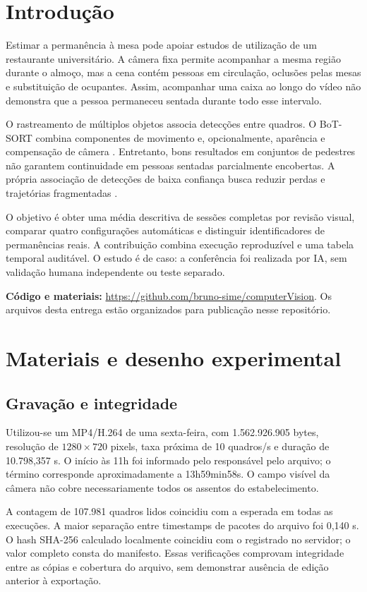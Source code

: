\documentclass[12pt,a4paper,twoside,openany,chapter=TITLE,subsection=TITLE,section=TITLE,subsubsection=TITLE,english,brazil]{abntex2}
\begin{document}
\chapter{Introdução}
Estimar a permanência à mesa pode apoiar estudos de utilização de um restaurante universitário. A câmera fixa permite acompanhar a mesma região durante o almoço, mas a cena contém pessoas em circulação, oclusões pelas mesas e substituição de ocupantes. Assim, acompanhar uma caixa ao longo do vídeo não demonstra que a pessoa permaneceu sentada durante todo esse intervalo.

O rastreamento de múltiplos objetos associa detecções entre quadros. O BoT-SORT combina componentes de movimento e, opcionalmente, aparência e compensação de câmera \cite{aharon2022}. Entretanto, bons resultados em conjuntos de pedestres não garantem continuidade em pessoas sentadas parcialmente encobertas. A própria associação de detecções de baixa confiança busca reduzir perdas e trajetórias fragmentadas \cite{zhang2022}.

O objetivo é obter uma média descritiva de sessões completas por revisão visual, comparar quatro configurações automáticas e distinguir identificadores de permanências reais. A contribuição combina execução reproduzível e uma tabela temporal auditável. O estudo é de caso: a conferência foi realizada por IA, sem validação humana independente ou teste separado.

\noindent\textbf{Código e materiais:} \url{https://github.com/bruno-sime/computerVision}. Os arquivos desta entrega estão organizados para publicação nesse repositório.

\clearpage
\chapter{Materiais e desenho experimental}
\section{Gravação e integridade}
Utilizou-se um MP4/H.264 de uma sexta-feira, com 1.562.926.905 bytes, resolução de $1280\times720$ pixels, taxa próxima de 10 quadros/s e duração de 10.798,357 s. O início às 11h foi informado pelo responsável pelo arquivo; o término corresponde aproximadamente a 13h59min58s. O campo visível da câmera não cobre necessariamente todos os assentos do estabelecimento.

A contagem de 107.981 quadros lidos coincidiu com a esperada em todas as execuções. A maior separação entre timestamps de pacotes do arquivo foi 0,140 s. O hash SHA-256 calculado localmente coincidiu com o registrado no servidor; o valor completo consta do manifesto. Essas verificações comprovam integridade entre as cópias e cobertura do arquivo, sem demonstrar ausência de edição anterior à exportação.
\end{document}
